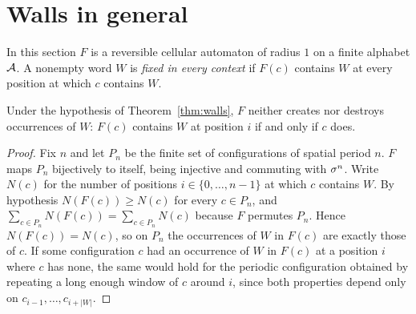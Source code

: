 \section{Walls in general}\label{sec:walls}

In this section $F$ is a reversible cellular automaton of radius $1$ on a finite alphabet $\mathcal{A}$. A nonempty word $W$ is \emph{fixed in every context} if $F(c)$ contains $W$ at every position at which $c$ contains $W$.

\begin{lemma}\label{lem:exact}
Under the hypothesis of Theorem~\ref{thm:walls}, $F$ neither creates nor destroys occurrences of $W$: $F(c)$ contains $W$ at position $i$ if and only if $c$ does.
\end{lemma}

\begin{proof}
Fix $n$ and let $P_n$ be the finite set of configurations of spatial period $n$. $F$ maps $P_n$ bijectively to itself, being injective and commuting with $\sigma^n$. Write $N(c)$ for the number of positions $i\in\{0,\dots,n-1\}$ at which $c$ contains $W$. By hypothesis $N(F(c))\ge N(c)$ for every $c\in P_n$, and $\sum_{c\in P_n}N(F(c))=\sum_{c\in P_n}N(c)$ because $F$ permutes $P_n$. Hence $N(F(c))=N(c)$, so on $P_n$ the occurrences of $W$ in $F(c)$ are exactly those of $c$. If some configuration $c$ had an occurrence of $W$ in $F(c)$ at a position $i$ where $c$ has none, the same would hold for the periodic configuration obtained by repeating a long enough window of $c$ around $i$, since both properties depend only on $c_{i-1},\dots,c_{i+|W|}$.
\end{proof}

